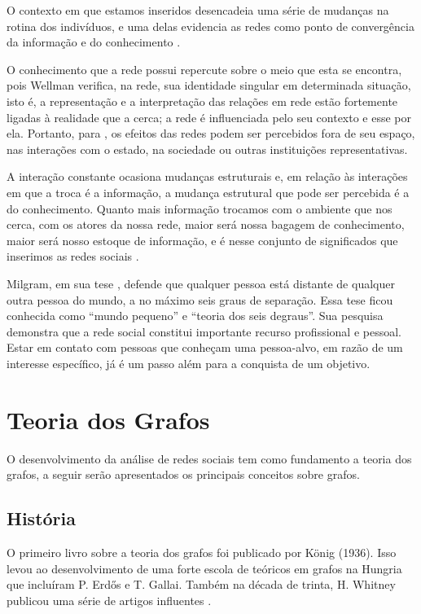 O contexto em que estamos inseridos desencadeia uma série de mudanças na rotina dos indivíduos, e uma delas evidencia as redes como ponto de convergência da informação e do conhecimento \cite{Tomae:Alcara:Chiara:2005}.

O conhecimento que a rede possui repercute sobre o meio que esta se encontra, pois Wellman \cite{Wellman:1996} verifica, na rede, sua identidade singular em determinada situação, isto é, a representação e a interpretação das relações em rede estão fortemente ligadas à realidade que a cerca; a rede é influenciada pelo seu contexto e esse por ela. Portanto, para \cite{Marteleto:2001}, os efeitos das redes podem ser percebidos fora de seu espaço, nas interações com o estado, na sociedade ou outras instituições representativas.

A interação constante ocasiona mudanças estruturais e, em relação às interações em que a troca é a informação, a mudança estrutural que pode ser percebida é a do conhecimento. Quanto mais informação trocamos com o ambiente que nos cerca, com os atores da nossa rede, maior será nossa bagagem de conhecimento, maior será nosso estoque de informação, e é nesse conjunto de significados que inserimos as redes sociais \cite{Tomae:Alcara:Chiara:2005}.

Milgram, em sua tese \cite{Milgram:1967}, defende que qualquer pessoa está distante de qualquer outra pessoa do mundo, a no máximo seis graus de separação. Essa tese ficou conhecida como ``mundo pequeno'' e ``teoria dos seis degraus''. Sua pesquisa demonstra que a rede social constitui importante recurso profissional e pessoal. Estar em contato com pessoas que conheçam uma pessoa-alvo, em razão de um interesse específico, já é um passo além para a conquista de um objetivo.

\section{Teoria dos Grafos}

O desenvolvimento da análise de redes sociais tem como fundamento a teoria dos grafos, a seguir serão apresentados os principais conceitos sobre grafos.

\subsection{História}

O primeiro livro sobre a teoria dos grafos foi publicado por König (1936). Isso levou ao desenvolvimento de uma forte escola de teóricos em grafos na Hungria que incluíram P. Erdős e T. Gallai. Também na década de trinta, H. Whitney publicou uma série de artigos influentes \cite{Bondy:2007}.

